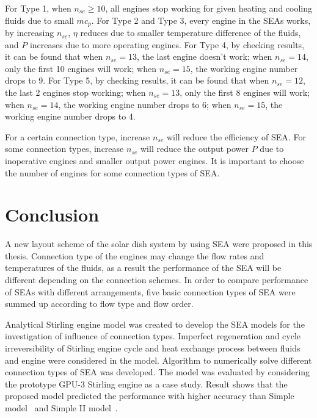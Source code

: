 For Type 1, when $n_{se} \geqslant 10$, all engines stop working for given heating and cooling fluids due to small $\dot{m}c_p$. For Type 2 and Type 3, every engine in the SEAs works, by increasing $n_{se}$, $\eta$ reduces due to smaller temperature difference of the fluids, and $P$ increases due to more operating engines. For Type 4, by checking results, it can be found that when $n_{se} = 13$,  the last engine doesn't work; when $n_{se} = 14$, only the first 10 engines will work; when $n_{se} = 15$, the working engine number drops to 9. For Type 5, by checking results, it can be found that when $n_{se} = 12$, the last 2 engines stop working; when $n_{se} = 13$, only the first 8 engines will work; when $n_{se} = 14$, the working engine number drops to 6; when $n_{se} = 15$, the working engine number drops to 4.

For a certain connection type, increase $n_{se}$ will reduce the efficiency of SEA. For some connection types, increase $n_{se}$ will reduce the output power $P$ due to inoperative engines and smaller output power engines. It is important to choose the number of engines for some connection types of SEA. 

\section{Conclusion}

A new layout scheme of the solar dish system by using SEA were proposed in this thesis. Connection type of the engines may change the flow rates and temperatures of the fluids, as a result the performance of the SEA will be different depending on the connection schemes. In order to compare performance of SEAs with different arrangements, five basic connection types of SEA were summed up according to flow type and flow order. 

Analytical Stirling engine model was created to develop the SEA models for the investigation of influence of connection types. Imperfect regeneration and cycle irreversibility of Stirling engine cycle and heat exchange process between fluids and engine were considered in the model. Algorithm to numerically solve different connection types of SEA was developed. The model was evaluated by considering the prototype GPU-3 Stirling engine as a case study. Result shows that the proposed model predicted the performance with higher accuracy than Simple model~\cite{Urieli1984} and Simple II model~\cite{Strauss2010}. 

